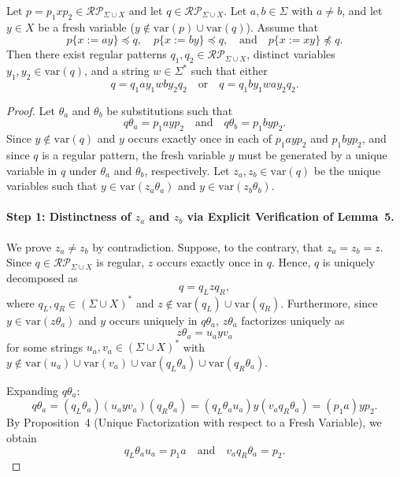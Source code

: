 {\begin{lem}\label{lem:lemma6_fixed}
Let $p = p_1 x p_2 \in \mathcal{RP}_{\Sigma \cup X}$ and let $q \in \mathcal{RP}_{\Sigma \cup X}$. Let $a, b \in \Sigma$ with $a \neq b$, and let $y \in X$ be a fresh variable ($y \notin \mathrm{var}(p) \cup \mathrm{var}(q)$).
Assume that
\[
p\{x := ay\} \preceq q, \quad p\{x := by\} \preceq q, \quad \text{and} \quad p\{x := xy\} \not\preceq q.
\]
Then there exist regular patterns $q_1, q_2 \in \mathcal{RP}_{\Sigma \cup X}$, distinct variables $y_1, y_2 \in \mathrm{var}(q)$, and a string $w \in \Sigma^*$ such that either
\begin{equation}\label{eq:form1}
q = q_1 a y_1 w b y_2 q_2 \quad \text{or} \quad q = q_1 b y_1 w a y_2 q_2.
\end{equation}
\end{lem}

\begin{proof}
Let $\theta_a$ and $\theta_b$ be substitutions such that
\[
q\theta_a = p_1 a y p_2 \quad \text{and} \quad q\theta_b = p_1 b y p_2.
\]
Since $y \notin \mathrm{var}(q)$ and $y$ occurs exactly once in each of $p_1 a y p_2$ and $p_1 b y p_2$, and since $q$ is a regular pattern, the fresh variable $y$ must be generated by a unique variable in $q$ under $\theta_a$ and $\theta_b$, respectively.
Let $z_a, z_b \in \mathrm{var}(q)$ be the unique variables such that $y \in \mathrm{var}(z_a\theta_a)$ and $y \in \mathrm{var}(z_b\theta_b)$.

\paragraph{Step 1: Distinctness of $z_a$ and $z_b$ via Explicit Verification of Lemma~5.}
We prove $z_a \neq z_b$ by contradiction. Suppose, to the contrary, that $z_a = z_b = z$.
Since $q \in \mathcal{RP}_{\Sigma \cup X}$ is regular, $z$ occurs exactly once in $q$. Hence, $q$ is uniquely decomposed as
\[
q = q_L z q_R,
\]
where $q_L, q_R \in (\Sigma \cup X)^*$ and $z \notin \mathrm{var}(q_L) \cup \mathrm{var}(q_R)$.
Furthermore, since $y \in \mathrm{var}(z\theta_a)$ and $y$ occurs uniquely in $q\theta_a$, $z\theta_a$ factorizes uniquely as
\[
z\theta_a = u_a y v_a
\]
for some strings $u_a, v_a \in (\Sigma \cup X)^*$ with $y \notin \mathrm{var}(u_a) \cup \mathrm{var}(v_a) \cup \mathrm{var}(q_L\theta_a) \cup \mathrm{var}(q_R\theta_a)$.

Expanding $q\theta_a$:
\[
q\theta_a = (q_L\theta_a)(u_a y v_a)(q_R\theta_a) = (q_L\theta_a u_a) y (v_a q_R\theta_a) = (p_1 a) y p_2.
\]
By Proposition~4 (Unique Factorization with respect to a Fresh Variable), we obtain
\begin{equation}\label{eq:step1_fact_a}
q_L\theta_a u_a = p_1 a \quad \text{and} \quad v_a q_R\theta_a = p_2.
\end{equation}


\end{proof}}
